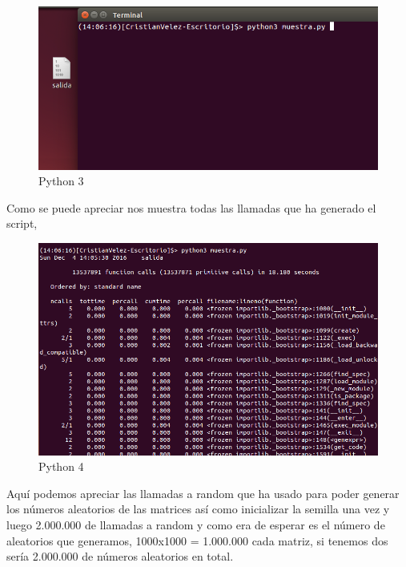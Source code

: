\begin{figure}[H] %
	\centering
	\includegraphics[scale=0.35]{pics/python3.png}  %
	\caption{Python 3} \label{fig:python3}
\end{figure}

Como se puede apreciar nos muestra todas las llamadas que ha generado el script,

\begin{figure}[H] %
	\centering
	\includegraphics[scale=0.35]{pics/python4.png}  %
	\caption{Python 4} \label{fig:python4}
\end{figure}

Aquí podemos apreciar las llamadas a random que ha usado para poder generar los números aleatorios de las matrices así como inicializar la semilla una vez y luego 2.000.000 de llamadas a random y como era de esperar es el número de aleatorios que generamos, 1000x1000 = 1.000.000 cada matriz, si tenemos dos sería 2.000.000 de números aleatorios en total.

